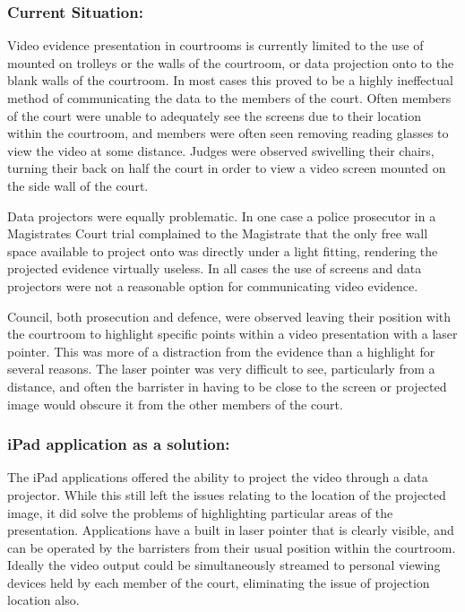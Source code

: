 \subsubsection{Current Situation:}
Video evidence presentation in courtrooms is currently limited to the use of  mounted on trolleys or the walls of the courtroom, or data projection onto to the blank walls of the courtroom. In most cases this proved to be a highly ineffectual method of communicating the data to the members of the court. Often members of the court were unable to adequately see the screens due to their location within the courtroom, and members were often  seen removing reading glasses to view the video at some distance. Judges were observed swivelling their chairs, turning their back on half the court in order to view a video screen mounted on the side wall of the court.

Data projectors were equally problematic. In one case a police prosecutor in a Magistrates Court trial complained to the Magistrate that the only free wall space available to project onto was directly under a light fitting, rendering the projected evidence virtually useless.
In all cases the use of screens and data projectors were not a reasonable option for communicating video evidence. 

Council, both prosecution and defence, were observed leaving their position with the courtroom to highlight specific points within a video presentation with a laser pointer. This was more of a distraction from the evidence than a highlight for several reasons. The laser pointer was very difficult to see, particularly from a distance, and often the barrister in having to be close to the screen or projected image would obscure it from the other members of the court.

\subsubsection{iPad application as a solution:}
The iPad applications offered the ability to project the video through a data projector. While this still left the issues relating to the location of the projected image, it did solve the problems of highlighting particular areas of the presentation. Applications have a built in laser pointer that is clearly visible, and can be operated by the barristers from their usual position within the courtroom. Ideally the video output could be simultaneously streamed to personal viewing devices held by each member of the court, eliminating the issue of projection location also.

